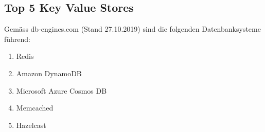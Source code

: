 \subsection{Top 5 Key Value Stores}
Gemäss db-engines.com (Stand 27.10.2019) sind die folgenden Datenbanksysteme führend:
\begin{enumerate}
\item Redis
\item Amazon DynamoDB
\item Microsoft Azure Cosmos DB
\item Memcached
\item Hazelcast
\end{enumerate}

